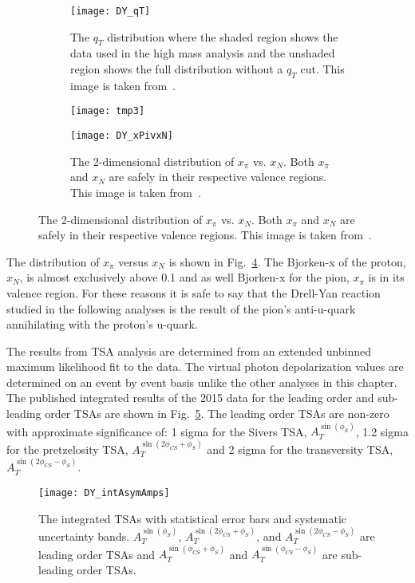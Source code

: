 \begin{figure}[h!t]
  \centering
  \begin{subfigure}{0.45\textwidth}
    \centering \texttt{[image: DY\_qT]}
    \caption{The $q_T$ distribution where the shaded region shows the data used
      in the high mass analysis and the unshaded region shows the full
      distribution without a $q_T$ cut.  This image is taken
      from~\cite{compassDYpaper}.}
    \label{fig::DY_qT}
  \end{subfigure}
  \begin{subfigure}{.02\textwidth}
    \texttt{[image: tmp3]}
    \label{fig::tmp3}%
  \end{subfigure}
    \begin{subfigure}{0.48\textwidth}
    \centering \texttt{[image: DY\_xPivxN]}
    \caption{The 2-dimensional distribution of $x_{\pi}$ vs. $x_{N}$.  Both
      $x_{\pi}$ and $x_N$ are safely in their respective valence regions.  This
      image is taken from~\cite{compassDYpaper}.}
    \label{fig::DY_xPivxN}
  \end{subfigure}
\end{figure}

The distribution of $x_{\pi}$ versus $x_N$ is shown in
Fig.~\ref{fig::DY_xPivxN}.  The Bjorken-x of the proton, $x_N$, is almost
exclusively above 0.1 and as well Bjorken-x for the pion, $x_{\pi}$ is in its
valence region.  For these reasons it is safe to say that the Drell-Yan reaction
studied in the following analyses is the result of the pion's anti-u-quark
annihilating with the proton's u-quark.

The results from TSA analysis are determined from an extended unbinned maximum
likelihood fit to the data.  The virtual photon depolarization values are
determined on an event by event basis unlike the other analyses in this chapter.
The published integrated results of the 2015 data for the leading order and
sub-leading order TSAs are shown in Fig.~\ref{fig::DY_intAsymAmps}.  The leading
order TSAs are non-zero with approximate significance of: 1 sigma for the
Sivers TSA, $A_T^{\sin(\phi_S)}$, 1.2 sigma for the pretzelosity TSA,
$A_T^{\sin(2\phi_{CS}+\phi_S)}$ and 2 sigma for the transversity TSA,
$A_T^{\sin(2\phi_{CS}-\phi_S)}$.

\begin{figure}[h!t]
  \centering \texttt{[image: DY\_intAsymAmps]}
  \caption{The integrated TSAs with statistical error bars and systematic
    uncertainty bands.  $A_T^{\sin(\phi_S)}$, $A_T^{\sin(2\phi_{CS}+\phi_S)}$,
    and $A_T^{\sin(2\phi_{CS}-\phi_S)}$ are leading order TSAs and
    $A_T^{\sin(\phi_{CS}+\phi_S)}$ and $A_T^{\sin(\phi_{CS}-\phi_S)}$ are
    sub-leading order TSAs.}
  \label{fig::DY_intAsymAmps}
\end{figure}

